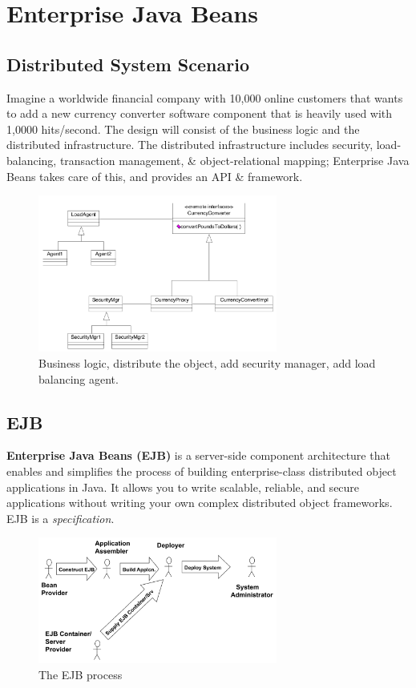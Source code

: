 \documentclass[a4paper,11pt]{article}
\begin{document}
\section{Enterprise Java Beans}
\subsection{Distributed System Scenario}
Imagine a worldwide financial company with 10,000 online customers that wants to add a new currency converter software component that is heavily used with 1,0000 hits/second.
The design will consist of the business logic and the distributed infrastructure.
The distributed infrastructure includes security, load-balancing, transaction management, \& object-relational mapping; Enterprise Java Beans takes care of this, and provides an API \& framework.

\begin{figure}[H]
    \centering
    \includegraphics[width=0.7\textwidth]{./images/distributed_system_scenario.png}
    \caption{
        Business logic, distribute the object, add security manager, add load balancing agent.
    }
\end{figure}

\subsection{EJB}
\textbf{Enterprise Java Beans (EJB)} is a server-side component architecture that enables and simplifies the process of building enterprise-class distributed object applications in Java.
It allows you to write scalable, reliable, and secure applications without writing your own complex distributed object frameworks.
EJB is a \textit{specification}.

\begin{figure}[H]
    \centering
    \includegraphics[width=0.7\textwidth]{./images/the_ejb_proces.png}
    \caption{
        The EJB process
    }
\end{figure}
\end{document}
